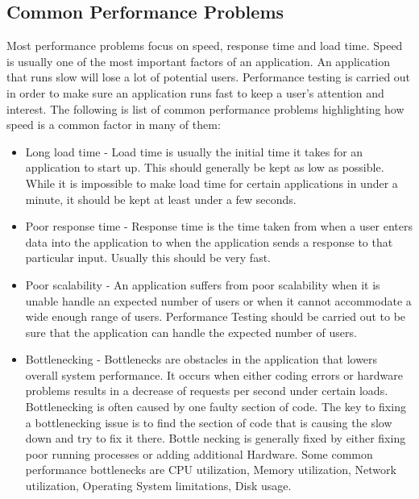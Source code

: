 \documentclass[../thesis.tex]{subfiles}
\begin{document}
	\subsection*{Common Performance Problems}
	Most performance problems focus on speed, response time and load time. Speed is usually one of the most important factors of an application. An application that runs slow will lose a lot of potential users. Performance testing is carried out in order to make sure an application runs fast to keep a user's attention and interest. The following is list of common performance problems highlighting how speed is a common factor in many of them:
	\newline
    
	\begin{itemize}
		\item Long load time - Load time is usually the initial time it takes for an application to start up. This should generally be kept as low as possible. While it is impossible to make load time for certain applications in under a minute, it should be kept at least under a few seconds.

		\item Poor response time - Response time is the time taken from when a user enters data into the application to when the application sends a response to that particular input. Usually this should be very fast. 

		\item Poor scalability - An application suffers from poor scalability when it is unable handle an expected number of users or when it cannot accommodate a wide enough range of users. Performance Testing should be carried out to be sure that the application can handle the expected number of users.

		\item Bottlenecking - Bottlenecks are obstacles in the application that lowers overall system performance. It occurs when either coding errors or hardware problems results in a decrease of requests per second under certain loads. Bottlenecking is often caused by one faulty section of code. The key to fixing a bottlenecking issue is to find the section of code that is causing the slow down and try to fix it there. Bottle necking is generally fixed by either fixing poor running processes or adding additional Hardware. Some common performance bottlenecks are CPU utilization, Memory utilization, Network utilization, Operating System limitations, Disk usage.
	\end{itemize}
\end{document}
